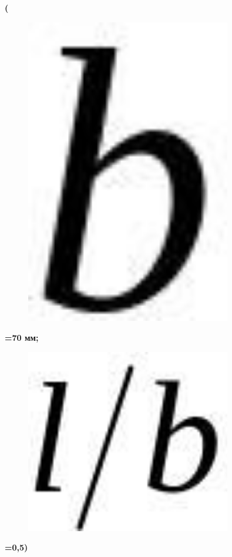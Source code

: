 {\bfseries (}\begin{figure}[H]
	\centering
	\includegraphics[width=0.8\textwidth]{assets/1207}
	\caption*{}
\end{figure}{\bfseries =70 мм;}
\begin{figure}[H]
	\centering
	\includegraphics[width=0.8\textwidth]{assets/1208}
	\caption*{}
\end{figure}{\bfseries =0,5)}

